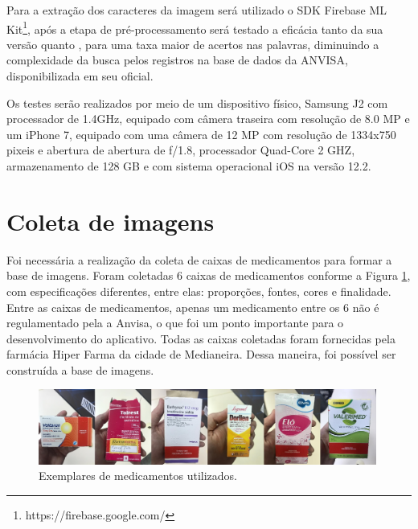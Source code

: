 Para a extração dos caracteres da imagem será utilizado o SDK Firebase ML Kit\footnote{https://firebase.google.com/}, após a etapa de pré-processamento será testado a eficácia tanto da sua versão  quanto , para uma taxa maior de acertos nas palavras, diminuindo a complexidade da busca pelos registros na base de dados da ANVISA, disponibilizada em seu  oficial.

Os testes serão realizados por meio de um dispositivo físico, Samsung J2 com processador de 1.4GHz, equipado com câmera traseira com resolução de 8.0 MP  e um iPhone 7, equipado com uma câmera de 12 MP com resolução de 1334x750 pixeis e abertura de abertura de ƒ/1.8, processador Quad-Core 2 GHZ, armazenamento de 128 GB e com sistema operacional iOS na versão 12.2.





\section{Coleta de imagens}

Foi necessária a realização da coleta de caixas de medicamentos para formar a base de imagens. Foram coletadas 6 caixas de medicamentos conforme a Figura \ref{exemplares}, com especificações diferentes, entre elas: proporções, fontes, cores e finalidade. Entre as caixas de medicamentos, apenas um medicamento entre os 6 não é regulamentado pela a Anvisa, o que foi um ponto importante para o desenvolvimento do aplicativo. Todas as caixas coletadas foram fornecidas pela farmácia Hiper Farma da cidade de Medianeira. Dessa maneira, foi possível ser construída a base de imagens.

 \begin{figure}[h!]
	\centering
	\includegraphics[width=0.99\textwidth]{Imagens/exemplares.jpg} 
	\caption[Exemplares de medicamentos utilizados.]{Exemplares de medicamentos utilizados.}
	\label{exemplares}
\end{figure}


